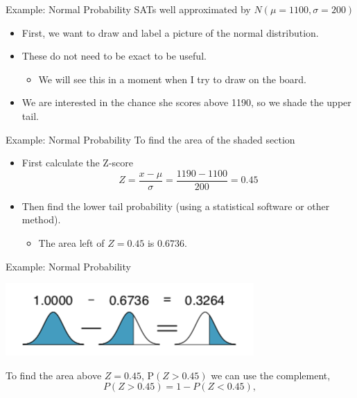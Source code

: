 \begin{frame}{Example: Normal Probability}
    SATs well approximated by $N (\mu = 1100, \sigma = 200)$
    \begin{itemize}
        \item First, we want to draw and label a picture of the normal distribution.
        \item These do not need to be exact to be useful.
        \begin{itemize}
            \item We will see this in a moment when I try to draw on the board.
        \end{itemize}
        \item We are interested in the chance she scores above 1190, so we shade the upper tail.
    \end{itemize}
\end{frame}

\begin{frame}{Example: Normal Probability}
    To find the area of the shaded section
    \begin{itemize}
        \item First calculate the Z-score
        \[
            Z = \frac{x-\mu}{\sigma} = \frac{1190-1100}{200} = 0.45
        \]
        \item Then find the lower tail probability (using a statistical software or other method). 
        \begin{itemize}
            \item The area left of $Z = 0.45$ is $0.6736$.
        \end{itemize}
    \end{itemize}
\end{frame}

\begin{frame}{Example: Normal Probability}
    \begin{center}
        \includegraphics[scale=0.65]{images/normalcomp.png}
    \end{center}
    To find the area above $Z = 0.45$, P$(Z > 0.45)$ we can use the complement,
    \[
        P(Z > 0.45)=1-P(Z<0.45),
    \]
\end{frame}

